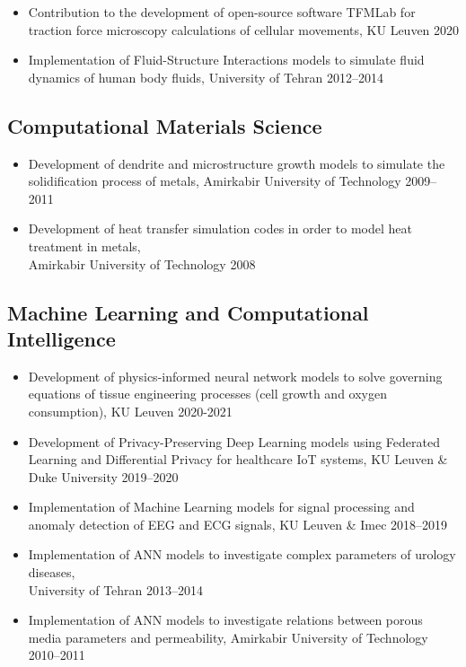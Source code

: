 \documentclass{cv}
\begin{document}
\begin{itemize}
\item 
Contribution to the development of open-source software TFMLab for traction force microscopy calculations of cellular movements, KU Leuven \hfill 2020
\item
Implementation of Fluid-Structure Interactions models to simulate fluid dynamics of human body fluids, {University of Tehran} \hfill 2012--2014
\end{itemize}

\subsection{Computational Materials Science}

\begin{itemize}
\item
Development of dendrite and microstructure growth models to simulate the solidification process of metals, {Amirkabir University of Technology} \hfill 2009--2011
\item
Development of heat transfer simulation codes in order to model heat treatment in metals, \\{Amirkabir University of Technology} \hfill 2008
\end{itemize}

\subsection{Machine Learning and Computational Intelligence}

\begin{itemize}
\item
Development of physics-informed neural network models to solve governing equations of tissue engineering processes (cell growth and oxygen consumption), {KU Leuven} \hfill 2020-2021
\item
Development of Privacy-Preserving Deep Learning models using Federated Learning and Differential Privacy for healthcare IoT systems, {KU Leuven \& Duke University} \hfill 2019--2020
\item
Implementation of Machine Learning models for signal processing and anomaly detection of EEG and ECG signals, {KU Leuven \& Imec} \hfill 2018--2019
\item
Implementation of ANN models to investigate complex parameters of urology diseases, \\{University of Tehran} \hfill 2013--2014
\item
Implementation of ANN models to investigate relations between porous media parameters and permeability, {Amirkabir University of Technology} \hfill 2010--2011
\end{itemize}
\end{document}
